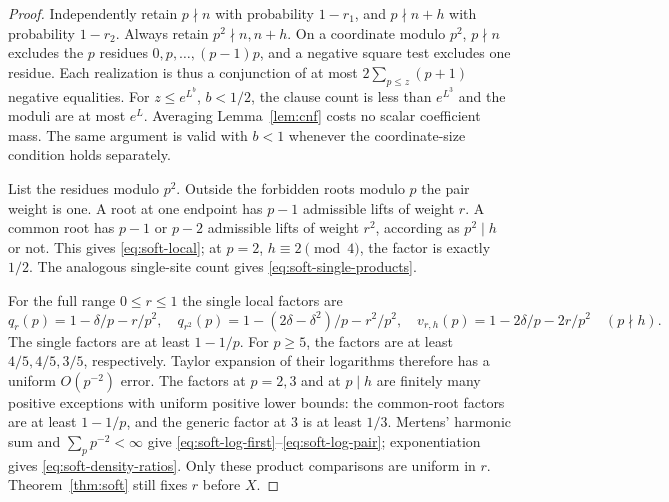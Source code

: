 \documentclass[11pt]{article}
\theoremstyle{definition}
\theoremstyle{remark}
\numberwithin{equation}{section}
\begin{document}
\begin{proof}
Independently retain $p\nmid n$ with probability $1-r_1$, and $p\nmid n+h$ with probability $1-r_2$.
Always retain $p^2\nmid n,n+h$. On a coordinate modulo $p^2$, $p\nmid n$ excludes the $p$ residues
$0,p,\ldots,(p-1)p$, and a negative square test excludes one residue. Each realization is thus a conjunction
of at most $2\sum_{p\le z}(p+1)$ negative equalities. For $z\le e^{L^b}$, $b<1/2$, the clause count is less than
$e^{L^3}$ and the moduli are at most $e^L$. Averaging Lemma~\ref{lem:cnf} costs no scalar coefficient mass.
The same argument is valid with $b<1$ whenever the coordinate-size condition holds separately.

List the residues modulo $p^2$. Outside the forbidden roots modulo $p$ the pair weight is one.
A root at one endpoint has $p-1$ admissible lifts of weight $r$.
A common root has $p-1$ or $p-2$ admissible lifts of weight $r^2$, according as $p^2\mid h$ or not.
This gives \eqref{eq:soft-local}; at $p=2$, $h\equiv2\pmod4$, the factor is exactly $1/2$.
The analogous single-site count gives \eqref{eq:soft-single-products}.

For the full range $0\le r\le1$ the single local factors are
\begin{equation}\label{eq:soft-local-expanded}
 q_r(p)=1-\delta/p-r/p^2,\quad
 q_{r^2}(p)=1-(2\delta-\delta^2)/p-r^2/p^2,\quad
 v_{r,h}(p)=1-2\delta/p-2r/p^2\quad(p\nmid h).
\end{equation}
The single factors are at least $1-1/p$. For $p\ge5$, the factors are at least $4/5,4/5,3/5$, respectively.
Taylor expansion of their logarithms therefore has a uniform $O(p^{-2})$ error.
The factors at $p=2,3$ and at $p\mid h$ are finitely many positive exceptions with uniform positive lower bounds:
the common-root factors are at least $1-1/p$, and the generic factor at $3$ is at least $1/3$.
Mertens' harmonic sum and $\sum_pp^{-2}<\infty$ give
\eqref{eq:soft-log-first}--\eqref{eq:soft-log-pair}; exponentiation gives \eqref{eq:soft-density-ratios}.
Only these product comparisons are uniform in $r$. Theorem~\ref{thm:soft} still fixes $r$ before $X$.
\end{proof}
\end{document}
